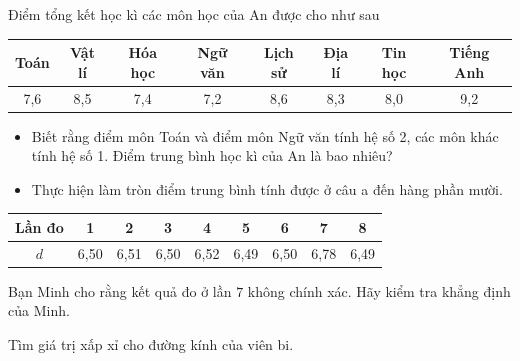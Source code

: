 \begin{bt}%
	Điểm tổng kết học kì các môn học của An được cho như sau
	\begin{center}
		\begin{tabular}{|c|c|c|c|c|c|c|c|}
			\hline
			Toán & Vật lí & Hóa học & Ngữ văn & Lịch sử & Địa lí & Tin học & Tiếng Anh \\
			\hline
			7{,}6 & 8{,}5 & 7{,}4 & 7{,}2 & 8{,}6 & 8{,}3 & 8{,}0 & 9{,}2 \\
			\hline
		\end{tabular}
	\end{center}
	\begin{itemize}
		\item[a.] Biết rằng điểm môn Toán và điểm môn Ngữ văn tính hệ số 2, các môn khác tính hệ số 1. Điểm trung bình học kì của An là bao nhiêu?
		\item[b.] Thực hiện làm tròn điểm trung bình tính được ở câu a đến hàng phần mười.
	\end{itemize}
\end{bt}

\begin{bt}%
	\begin{center}
		\begin{tabular}{|c|c|c|c|c|c|c|c|c|}
			\hline
			Lần đo & 1 & 2 & 3 & 4 & 5 & 6 & 7 & 8 \\
			\hline
			$d$ & 6{,}50 & 6{,}51 & 6{,}50 & 6{,}52 & 6{,}49 & 6{,}50 & 6{,}78 & 6{,}49\\
			\hline
		\end{tabular}
	\end{center}
	\begin{listEX}[1]
		\item [a.] Bạn Minh cho rằng kết quả đo ở lần $7$ không chính xác. Hãy kiểm tra khẳng định của Minh.
		\item [b.] Tìm giá trị xấp xỉ cho đường kính của viên bi.
	\end{listEX}
\end{bt}

